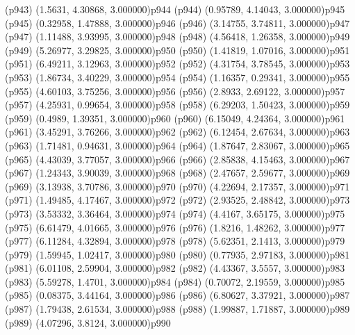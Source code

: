 \psdot(p943)
\psPoint(1.5631, 4.30868, 3.000000){p944}
\psdot(p944)
\psPoint(0.95789, 4.14043, 3.000000){p945}
\psdot(p945)
\psPoint(0.32958, 1.47888, 3.000000){p946}
\psdot(p946)
\psPoint(3.14755, 3.74811, 3.000000){p947}
\psdot(p947)
\psPoint(1.11488, 3.93995, 3.000000){p948}
\psdot(p948)
\psPoint(4.56418, 1.26358, 3.000000){p949}
\psdot(p949)
\psPoint(5.26977, 3.29825, 3.000000){p950}
\psdot(p950)
\psPoint(1.41819, 1.07016, 3.000000){p951}
\psdot(p951)
\psPoint(6.49211, 3.12963, 3.000000){p952}
\psdot(p952)
\psPoint(4.31754, 3.78545, 3.000000){p953}
\psdot(p953)
\psPoint(1.86734, 3.40229, 3.000000){p954}
\psdot(p954)
\psPoint(1.16357, 0.29341, 3.000000){p955}
\psdot(p955)
\psPoint(4.60103, 3.75256, 3.000000){p956}
\psdot(p956)
\psPoint(2.8933, 2.69122, 3.000000){p957}
\psdot(p957)
\psPoint(4.25931, 0.99654, 3.000000){p958}
\psdot(p958)
\psPoint(6.29203, 1.50423, 3.000000){p959}
\psdot(p959)
\psPoint(0.4989, 1.39351, 3.000000){p960}
\psdot(p960)
\psPoint(6.15049, 4.24364, 3.000000){p961}
\psdot(p961)
\psPoint(3.45291, 3.76266, 3.000000){p962}
\psdot(p962)
\psPoint(6.12454, 2.67634, 3.000000){p963}
\psdot(p963)
\psPoint(1.71481, 0.94631, 3.000000){p964}
\psdot(p964)
\psPoint(1.87647, 2.83067, 3.000000){p965}
\psdot(p965)
\psPoint(4.43039, 3.77057, 3.000000){p966}
\psdot(p966)
\psPoint(2.85838, 4.15463, 3.000000){p967}
\psdot(p967)
\psPoint(1.24343, 3.90039, 3.000000){p968}
\psdot(p968)
\psPoint(2.47657, 2.59677, 3.000000){p969}
\psdot(p969)
\psPoint(3.13938, 3.70786, 3.000000){p970}
\psdot(p970)
\psPoint(4.22694, 2.17357, 3.000000){p971}
\psdot(p971)
\psPoint(1.49485, 4.17467, 3.000000){p972}
\psdot(p972)
\psPoint(2.93525, 2.48842, 3.000000){p973}
\psdot(p973)
\psPoint(3.53332, 3.36464, 3.000000){p974}
\psdot(p974)
\psPoint(4.4167, 3.65175, 3.000000){p975}
\psdot(p975)
\psPoint(6.61479, 4.01665, 3.000000){p976}
\psdot(p976)
\psPoint(1.8216, 1.48262, 3.000000){p977}
\psdot(p977)
\psPoint(6.11284, 4.32894, 3.000000){p978}
\psdot(p978)
\psPoint(5.62351, 2.1413, 3.000000){p979}
\psdot(p979)
\psPoint(1.59945, 1.02417, 3.000000){p980}
\psdot(p980)
\psPoint(0.77935, 2.97183, 3.000000){p981}
\psdot(p981)
\psPoint(6.01108, 2.59904, 3.000000){p982}
\psdot(p982)
\psPoint(4.43367, 3.5557, 3.000000){p983}
\psdot(p983)
\psPoint(5.59278, 1.4701, 3.000000){p984}
\psdot(p984)
\psPoint(0.70072, 2.19559, 3.000000){p985}
\psdot(p985)
\psPoint(0.08375, 3.44164, 3.000000){p986}
\psdot(p986)
\psPoint(6.80627, 3.37921, 3.000000){p987}
\psdot(p987)
\psPoint(1.79438, 2.61534, 3.000000){p988}
\psdot(p988)
\psPoint(1.99887, 1.71887, 3.000000){p989}
\psdot(p989)
\psPoint(4.07296, 3.8124, 3.000000){p990}
